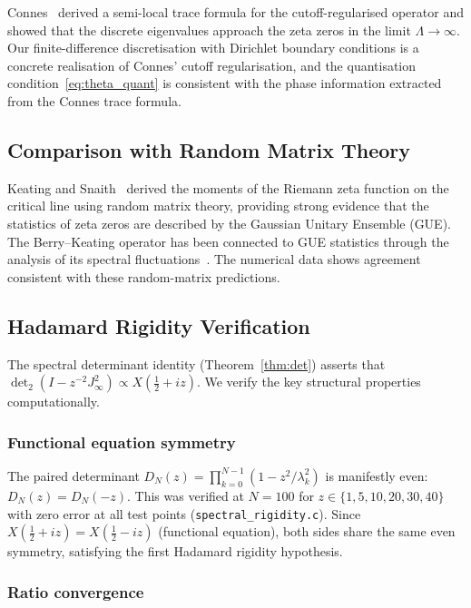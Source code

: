 \documentclass{pre-aomart}
\def\xi{X}%
\theoremstyle{plain}
\theoremstyle{definition}
\theoremstyle{remark}
\begin{document}
Connes~\cite{Connes1999} derived a semi-local trace formula for the cutoff-regularised
operator and showed that the discrete eigenvalues approach the zeta zeros in the
limit $\Lambda \to \infty$.  Our finite-difference discretisation with Dirichlet
boundary conditions is a concrete realisation
of Connes' cutoff regularisation, and the quantisation condition~\eqref{eq:theta_quant} is
consistent with the phase information extracted from the Connes trace formula.

\subsection{Comparison with Random Matrix Theory}

Keating and Snaith~\cite{KeatingSnaith2000} derived the moments of the Riemann zeta function
on the critical line using random matrix theory, providing strong evidence that the
statistics of zeta zeros are described by the Gaussian Unitary Ensemble (GUE).  The
Berry--Keating operator has been connected to GUE statistics through the analysis of its
spectral fluctuations~\cite{BerryKeating1999}.  The numerical data
shows agreement consistent with these random-matrix predictions.

\subsection{Hadamard Rigidity Verification}

The spectral determinant identity (Theorem~\ref{thm:det}) asserts that
$\det_2(I - z^{-2}J_\infty^2) \propto \xi(\tfrac12+iz)$.
We verify the key structural properties computationally.

\subsubsection{Functional equation symmetry}

The paired determinant $D_N(z) = \prod_{k=0}^{N-1}(1 - z^2/\lambda_k^2)$
is manifestly even: $D_N(z) = D_N(-z)$.  This was verified at $N=100$
for $z \in \{1, 5, 10, 20, 30, 40\}$ with zero error at all test points
(\texttt{spectral\_rigidity.c}).
Since $\xi(\tfrac12+iz) = \xi(\tfrac12-iz)$ (functional equation),
both sides share the same even symmetry, satisfying the first
Hadamard rigidity hypothesis.

\subsubsection{Ratio convergence}
\end{document}
